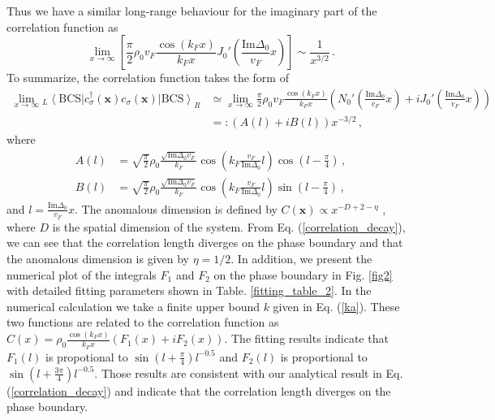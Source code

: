 \documentclass[aps,onecolumn,nofootinbib,superscriptaddress,notitlepage,longbibliography]{revtex4-1}
\begin{document}
Thus we have a similar long-range behaviour for the imaginary part of the correlation function as
\begin{equation}
	\lim_{x \rightarrow \infty} \left[  \frac{\pi}{2} \rho_0 v_F \frac{\cos (k_F x)}{k_Fx}
	J_0' \left( \frac{\text{Im} \Delta_0}{v_F} x \right) \right] \sim \frac{1}{x^{3 / 2}}\,.
	\label{Imexact}
\end{equation}
To summarize, the correlation function takes the form of
\begin{align}
  \lim_{x\rightarrow\infty}{}_L \left\langle\text{BCS} \right| c_{\sigma}^{\dagger}(\bm{x}) c_{\sigma}(\bm{x}) \left| \text{BCS}
  \right\rangle_R&\simeq \lim_{x\rightarrow\infty}\frac{\pi}{2} \rho_0 v_F \frac{\cos (k_F x)}{k_Fx}( N_0' ( \frac{\text{Im}\Delta_0}{v_F} x )+iJ_0'( \frac{\text{Im}\Delta_0}{v_F} x ))\nonumber\\
  &=:(A(l)+iB(l))x^{-3/2}\,,
  \label{correlation_decay}
\end{align}
where
\begin{align}
    A(l)&=\sqrt{\frac{\pi}{2}}\rho_0 \frac{\sqrt{\text{Im}\Delta_0 v_F}}{k_F} \cos (k_F \frac{v_F}{\text{Im}\Delta_0}l)\cos(l-\frac{\pi}{4})\,,\nonumber\\
    B(l)&=\sqrt{\frac{\pi}{2}}\rho_0 \frac{\sqrt{\text{Im}\Delta_0 v_F}}{k_F} \cos (k_F \frac{v_F}{\text{Im}\Delta_0}l)\sin(l-\frac{\pi}{4})\,,
\end{align}
and $l= \frac{\text{Im}\Delta_0}{v_F} x$. The anomalous dimension is defined by $C(\bm{x})\propto x^{-D+2-\eta}$ \cite{Sachdev:2011uj}, where $D$ is the spatial dimension of the system. From Eq. (\ref{correlation_decay}), we can see that the correlation length diverges on the phase boundary and that the anomalous dimension is given by $\eta=1/2$. In addition, we present the numerical plot of the integrals $F_1$ and $F_2$ on the phase boundary in Fig. \ref{fig2} with detailed fitting parameters shown in Table. \ref{fitting_table_2}. In the numerical calculation we take a finite upper bound $k$ given in Eq. (\ref{ka}). These two functions are related to the correlation function as $C(x)=\rho_0 \frac{\cos (k_F x)}{k_Fx}(F_1(x)+iF_2(x))$. %
The fitting results indicate that $F_1(l)$ is propotional to $\sin(l+\frac{\pi}{4})l^{-0.5}$ and $F_2(l)$ is proportional to $\sin(l+\frac{3\pi}{4})l^{-0.5}$. Those results are consistent with our analytical result in Eq. (\ref{correlation_decay}) and indicate that the correlation length diverges on the phase boundary.
\end{document}
